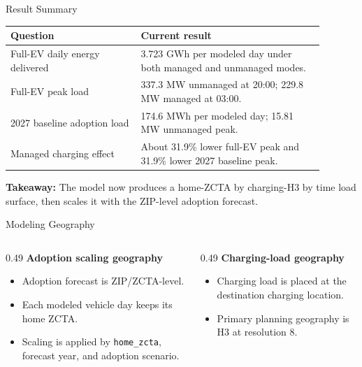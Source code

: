 \documentclass[aspectratio=169]{beamer}
\newcommand{\mw}{\mathrm{MW}}
\newcommand{\mwh}{\mathrm{MWh}}
\newcommand{\gwh}{\mathrm{GWh}}
\newcommand{\takeaway}[1]{\vspace{0.5em}\textcolor{evblue}{\textbf{Takeaway:}} #1}
\begin{document}
\begin{frame}{Result Summary}
\small
\begin{tabular}{p{0.37\linewidth}p{0.52\linewidth}}
\toprule
\textbf{Question} & \textbf{Current result} \\
\midrule
Full-EV daily energy delivered & 3.723 \(\gwh\) per modeled day under both managed and unmanaged modes. \\
Full-EV peak load & 337.3 \(\mw\) unmanaged at 20:00; 229.8 \(\mw\) managed at 03:00. \\
2027 baseline adoption load & 174.6 \(\mwh\) per modeled day; 15.81 \(\mw\) unmanaged peak. \\
Managed charging effect & About 31.9\% lower full-EV peak and 31.9\% lower 2027 baseline peak. \\
\bottomrule
\end{tabular}

\takeaway{The model now produces a home-ZCTA by charging-H3 by time load surface, then scales it with the ZIP-level adoption forecast.}
\end{frame}

\begin{frame}{Modeling Geography}
\small
\begin{columns}[T,totalwidth=\linewidth]
\begin{column}{0.49\linewidth}
\textbf{Adoption scaling geography}
\begin{itemize}
  \item Adoption forecast is ZIP/ZCTA-level.
  \item Each modeled vehicle day keeps its home ZCTA.
  \item Scaling is applied by \texttt{home\_zcta}, forecast year, and adoption scenario.
\end{itemize}
\end{column}
\begin{column}{0.49\linewidth}
\textbf{Charging-load geography}
\begin{itemize}
  \item Charging load is placed at the destination charging location.
  \item Primary planning geography is H3 at resolution 8.
\end{itemize}
\end{column}
\end{columns}
\end{frame}
\end{document}
